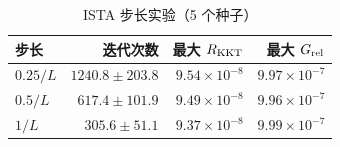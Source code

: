 \begin{table}[htbp]
\centering\small
\caption{ISTA 步长实验（5 个种子）}\label{tab:steps}
\begin{tabular}{lrrr}
\toprule
步长 & 迭代次数 & 最大 $R_{\rm KKT}$ & 最大 $G_{\rm rel}$ \\
\midrule
$0.25/L$ & $1240.8\pm203.8$ & $9.54\times10^{-8}$ & $9.97\times10^{-7}$ \\
$0.5/L$ & $617.4\pm101.9$ & $9.49\times10^{-8}$ & $9.96\times10^{-7}$ \\
$1/L$ & $305.6\pm51.1$ & $9.37\times10^{-8}$ & $9.99\times10^{-7}$ \\
\bottomrule
\end{tabular}
\end{table}
